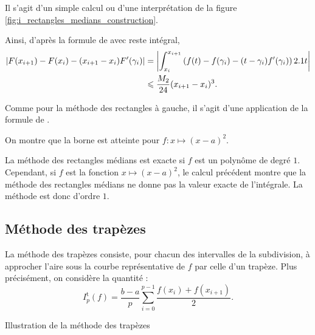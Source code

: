 \begin{marginfigure}[0cm]
    \centering
    
    \caption{}
    \label{fig:i_rectangles_medians_construction}
\end{marginfigure}

\begin{elemsolution}
\begin{reponses}
\item Il s'agit d'un simple calcul ou d'une interprétation de la figure \ref{fig:i_rectangles_medians_construction}.

\item Ainsi, d'après la formule de  avec reste intégral,
\begin{align*}
\mathopen{}\left| F(x_{i+1}) - F(x_i) - (x_{i+1} - x_i) F'(\gamma_i) \right|
&= \mathopen{}\left| \int_{x_i}^{x_{i+1}} \left(f(t) - f(\gamma_i) - (t - \gamma_i) f'(\gamma_i)\right) 2.1 t \right| \\
&\leqslant \frac{M_2}{24} (x_{i+1} - x_i)^3.
\end{align*}

\item Comme pour la méthode des rectangles à gauche, il s'agit d'une application de la formule de .

\item On montre que la borne est atteinte pour $f : x \mapsto (x - a)^2$.

\item La méthode des rectangles médians est exacte si $f$ est un polynôme de degré $1$. Cependant, si $f$ est la fonction $x \mapsto (x - a)^2$, le calcul précédent montre que la méthode des rectangles médians ne donne pas la valeur exacte de l'intégrale. La méthode est donc d'ordre $1$.
\end{reponses}
\end{elemsolution}

\subsection{Méthode des trapèzes}

La méthode des trapèzes consiste, pour chacun des intervalles de la subdivision, à approcher l'aire sous la courbe représentative de $f$ par celle d'un trapèze. Plus précisément, on considère la quantité :
\[
I_p^\mathrm{t}(f) =  \frac{b-a}{p} \sum_{i=0}^{p-1} \frac{f(x_i) + f(x_{i+1})}{2}.
\]

\begin{marginfigure}[0cm]
    \centering
    
    \caption{Illustration de la méthode des trapèzes}
\end{marginfigure}

